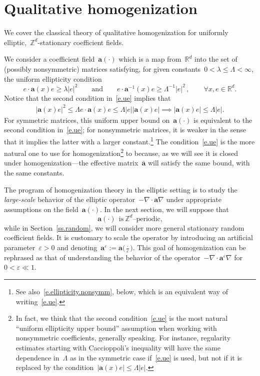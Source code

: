 \documentclass[11pt,twoside]{article} %
\numberwithin{equation}{section}
\theoremstyle{definition}
\newcommand*{\R}{\ensuremath{\mathbb{R}}}
\newcommand*{\Zd}{\ensuremath{\mathbb{Z}^d}}
\newcommand*{\Rd}{\ensuremath{\mathbb{R}^d}}
\newcommand{\eps}{\varepsilon}
\newcommand{\ep}{\eps}
\renewcommand{\a}{\mathbf{a}}
\newcommand{\ahom}{\bar{\a}}
\begin{document}
\section{Qualitative homogenization}
\label{s.qualitativetheory}

We cover the classical theory of qualitative homogenization for uniformly elliptic,~$\Zd$-stationary coefficient fields. 

\smallskip

We consider a coefficient field~$\a(\cdot)$ which is a map from~$\Rd$ into the set of (possibly nonsymmetric) matrices satisfying, for given constants~$0 < \lambda\leq \Lambda <\infty$, the uniform ellipticity condition
\begin{equation}
\label{e.ue}
e\cdot \a(x) e
\geq \lambda |e|^2 
\qquad \mbox{and} \qquad
e \cdot \a^{-1} (x) e 
\geq \Lambda^{-1}  |e|^2 
\,,
\qquad 
\forall x,e\in\R^d. 
\end{equation}
Notice that the second condition in~\eqref{e.ue} implies that 
\begin{align*}
| \a(x) e |^2
\leq\Lambda e \cdot \a(x) e 
\leq 
\Lambda |e| |\a(x) e| \implies | \a(x) e | \leq \Lambda |e|.
\end{align*}
For symmetric matrices, this uniform upper bound on~$\a(\cdot)$ is equivalent to the second condition in~\eqref{e.ue}; for nonsymmetric matrices, it is weaker in the sense that it implies the latter with a larger constant.\footnote{See also~\eqref{e.ellipticity.nonsymm}, below, which is an equivalent way of writing~\eqref{e.ue}.} 
The condition~\eqref{e.ue} is the more natural one to use for homogenization\footnote{In fact, we think that the second condition~\eqref{e.ue} is the most natural ``uniform ellipticity upper bound'' assumption when working with nonsymmetric coefficients, generally speaking. For instance, regularity estimates starting with Caccioppoli's inequality will have the same dependence in~$\Lambda$ as in the symmetric case if~\eqref{e.ue} is used, but not if it is replaced by the condition~$|\a(x)e| \leq \Lambda |e|$.} to because, as we will see it is closed under homogenization---the effective matrix~$\ahom$ will satisfy the same bound, with the same constants.

\smallskip

The program of homogenization theory in the elliptic setting is to study the \emph{large-scale} behavior of the elliptic operator~$-\nabla \cdot \a\nabla$ under appropriate assumptions on the field~$\a(\cdot)$. 
In the next section, we will suppose that
\begin{equation}
\a(\cdot) \ \  \mbox{is} \ \mbox{$\Zd$--periodic,}
\end{equation}
while in Section~\ref{ss.random}, we will consider more general stationary random coefficient fields.  
It is customary to scale the operator by introducing an artificial parameter~$\ep>0$ and denoting~$\a^\ep:=\a\bigl(\tfrac \cdot \ep \bigr)$. This goal of homogenization can be rephrased as that of understanding the behavior of the operator~$-\nabla \cdot \a^\ep \nabla$ for~$0< \ep \ll 1$. 
\end{document}
